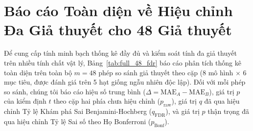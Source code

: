 \documentclass[10pt,twocolumn,letterpaper]{article}
\begin{document}



\clearpage
\appendix
\section{Báo cáo Toàn diện về Hiệu chỉnh Đa Giả thuyết cho 48 Giả thuyết}
\label{sec:appendix_fdr}

Để cung cấp tính minh bạch thống kê đầy đủ và kiểm soát tính đa giả thuyết trên nhiều tính chất vật lý, Bảng~\ref{tab:full_48_fdr} báo cáo phân tích thống kê toàn diện trên toàn bộ $m = 48$ phép so sánh giả thuyết theo cặp ($8$ mô hình $\times$ $6$ mục tiêu, được đánh giá trên 5 hạt giống ngẫu nhiên độc lập). Đối với mỗi phép so sánh, chúng tôi báo cáo hiệu số trung bình ($\Delta = \text{MAE}_A - \text{MAE}_B$), giá trị $p$ của kiểm định $t$ theo cặp hai phía chưa hiệu chỉnh ($p_{\mathrm{raw}}$), giá trị $q$ đã qua hiệu chỉnh Tỷ lệ Khám phá Sai Benjamini-Hochberg ($q_{\mathrm{FDR}}$), và giá trị $p$ thận trọng đã qua hiệu chỉnh Tỷ lệ Sai số theo Họ Bonferroni ($p_{\mathrm{Bonf}}$).


\end{document}
